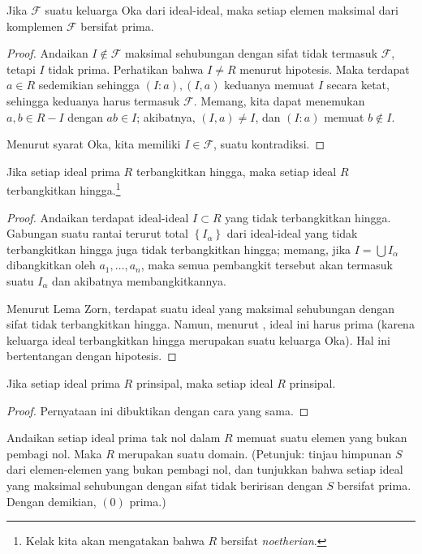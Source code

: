 \begin{proposition}\label{okathm} Jika $\mathcal{F}$ suatu keluarga Oka
dari
ideal-ideal, maka setiap elemen maksimal dari komplemen $\mathcal{F}$ bersifat prima.
\end{proposition} 
\begin{proof} 
Andaikan $I \notin \mathcal{F}$ maksimal sehubungan dengan 
sifat tidak termasuk $\mathcal{F}$,
tetapi $I$ tidak prima. Perhatikan bahwa $I \neq R$ menurut hipotesis.
Maka terdapat $a \in R$ sedemikian sehingga $(I:a), (I,a)$ keduanya memuat $I$ secara ketat,
sehingga keduanya harus termasuk $\mathcal{F}$.
Memang, kita dapat menemukan $a,b \in R - I$ dengan $ab \in I$; akibatnya, $(I,a)
\neq I$, dan $(I:a)$ memuat $b \notin I$.

Menurut syarat Oka, kita memiliki $I \in
\mathcal{F}$, suatu kontradiksi.
\end{proof} 

\begin{corollary}[Cohen] \label{primenoetherian}
Jika setiap ideal prima $R$ terbangkitkan hingga, maka setiap ideal $R$
terbangkitkan hingga.\footnote{Kelak kita akan mengatakan bahwa $R$ bersifat \emph{noetherian}.} 
\end{corollary} 

\begin{proof} 
Andaikan terdapat ideal-ideal $I \subset R$ yang tidak terbangkitkan
hingga.
Gabungan suatu rantai terurut total $\left\{I_\alpha\right\}$ dari ideal-ideal yang
tidak terbangkitkan hingga juga tidak
terbangkitkan hingga; memang, jika $I = \bigcup I_\alpha$ dibangkitkan oleh $a_1, \dots,
a_n$, maka semua pembangkit tersebut akan termasuk suatu $I_\alpha $ dan akibatnya
membangkitkannya.

Menurut Lema Zorn, terdapat suatu ideal yang maksimal sehubungan dengan sifat tidak
terbangkitkan hingga. Namun, menurut , ideal ini harus
prima (karena keluarga ideal terbangkitkan hingga merupakan suatu keluarga Oka). Hal ini bertentangan dengan hipotesis.
\end{proof} 

\begin{corollary} 
Jika setiap ideal prima $R$ prinsipal, maka setiap ideal $R$ prinsipal.
\end{corollary} 
\begin{proof} 
Pernyataan ini dibuktikan dengan cara yang sama.
\end{proof} 

\begin{exercise} 
Andaikan setiap ideal prima tak nol dalam $R$ memuat suatu elemen yang bukan pembagi nol. Maka $R$
merupakan suatu domain. (Petunjuk: tinjau himpunan $S$ dari elemen-elemen yang bukan pembagi nol, dan tunjukkan bahwa
setiap ideal yang maksimal sehubungan dengan sifat tidak beririsan dengan $S$ bersifat prima. Dengan demikian, $(0)$
prima.)
\end{exercise} 


